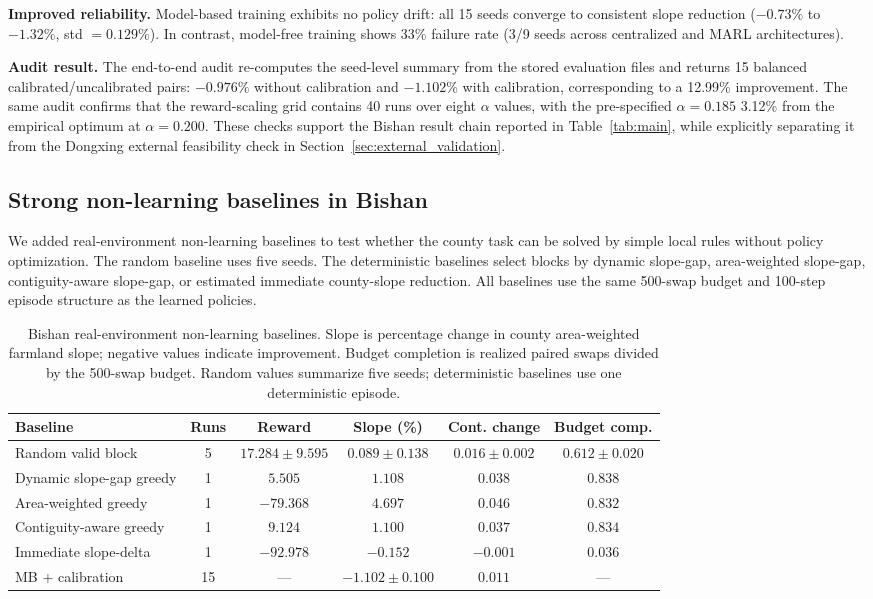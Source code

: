 \documentclass[11pt]{article}
\begin{document}
\textbf{Improved reliability.} Model-based training exhibits no policy drift: all 15 seeds converge to consistent slope reduction ($-0.73\%$ to $-1.32\%$, std $= 0.129\%$). In contrast, model-free training shows 33\% failure rate (3/9 seeds across centralized and MARL architectures).

\textbf{Audit result.} The end-to-end audit re-computes the seed-level summary from the stored evaluation files and returns 15 balanced calibrated/uncalibrated pairs: $-0.976\%$ without calibration and $-1.102\%$ with calibration, corresponding to a 12.99\% improvement. The same audit confirms that the reward-scaling grid contains 40 runs over eight $\alpha$ values, with the pre-specified $\alpha=0.185$ 3.12\% from the empirical optimum at $\alpha=0.200$. These checks support the Bishan result chain reported in Table~\ref{tab:main}, while explicitly separating it from the Dongxing external feasibility check in Section~\ref{sec:external_validation}.

\subsection{Strong non-learning baselines in Bishan}
\label{sec:bishan_nonlearning}

We added real-environment non-learning baselines to test whether the county task can be solved by simple local rules without policy optimization. The random baseline uses five seeds. The deterministic baselines select blocks by dynamic slope-gap, area-weighted slope-gap, contiguity-aware slope-gap, or estimated immediate county-slope reduction. All baselines use the same 500-swap budget and 100-step episode structure as the learned policies.

\begin{table}[htbp]
\centering
\scriptsize
\setlength{\tabcolsep}{3pt}
\caption{Bishan real-environment non-learning baselines. Slope is percentage change in county area-weighted farmland slope; negative values indicate improvement. Budget completion is realized paired swaps divided by the 500-swap budget. Random values summarize five seeds; deterministic baselines use one deterministic episode.}
\label{tab:bishan_nonlearning}
\begin{tabular}{lccccc}
\toprule
Baseline & Runs & Reward & Slope (\%) & Cont. change & Budget comp. \\
\midrule
Random valid block & 5 & $17.284 \pm 9.595$ & $0.089 \pm 0.138$ & $0.016 \pm 0.002$ & $0.612 \pm 0.020$ \\
Dynamic slope-gap greedy & 1 & $5.505$ & $1.108$ & $0.038$ & $0.838$ \\
Area-weighted greedy & 1 & $-79.368$ & $4.697$ & $0.046$ & $0.832$ \\
Contiguity-aware greedy & 1 & $9.124$ & $1.100$ & $0.037$ & $0.834$ \\
Immediate slope-delta & 1 & $-92.978$ & $-0.152$ & $-0.001$ & $0.036$ \\
MB + calibration & 15 & --- & $\mathbf{-1.102 \pm 0.100}$ & $0.011$ & --- \\
\bottomrule
\end{tabular}
\end{table}
\end{document}
